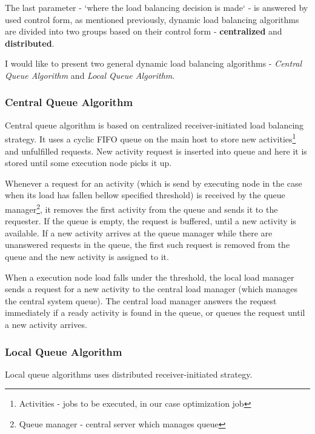\smallskip
The last parameter - `where the load balancing decision is made` - is answered by used control form,
as mentioned previously,
dynamic load balancing algorithms are divided into two groups based on their control form - \textbf{centralized} and \textbf{distributed}.

\medskip
\noindent I would like to present two general dynamic load balancing algorithms - \textit{Central Queue Algorithm} and \textit{Local Queue Algorithm}.

\subsubsection{Central Queue Algorithm}
Central queue algorithm is based on centralized receiver-initiated load balancing strategy.
It uses a cyclic FIFO queue on the main host to store new activities\footnote{Activities - jobs to be executed, in our case optimization job}
and unfulfilled requests.
New activity request is inserted into queue and here it is stored until some execution node picks it up.

Whenever a request for an activity (which is send by executing node in the case when its load has fallen bellow specified threshold)
is received by the queue manager\footnote{Queue manager - central server which manages queue},
it removes the first activity from the queue and sends it to the requester.
If the queue is empty, the request is buffered, until a new activity is available.
If a new activity arrives at the queue manager while there are unanswered requests in the queue,
the first such request is removed from the queue and the new activity is assigned to it.

When a execution node load falls under the threshold,
the local load manager sends a request for a new activity to the central load manager (which manages the central system queue).
The central load manager answers the request immediately if a ready activity is found in the queue,
or queues the request until a new activity arrives\cite{sharma2008performance}.


\subsubsection{Local Queue Algorithm}
Local queue algorithms uses distributed receiver-initiated strategy.

